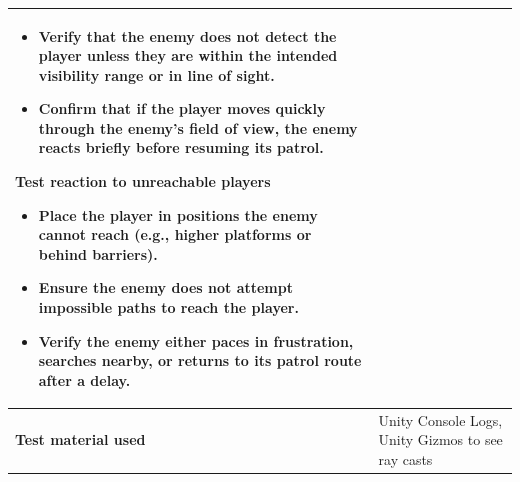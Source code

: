 \documentclass[11pt, a4paper]{article}
\begin{document}
\begin{center}
\begin{tabularx}{\linewidth}{|>{\raggedright\arraybackslash}m{4cm}|X|}
\begin{itemize}
        \item Verify that the enemy does not detect the player unless they are within the intended visibility range or in line of sight.
        \item Confirm that if the player moves quickly through the enemy’s field of view, the enemy reacts briefly before resuming its patrol.
    \end{itemize}
    \textbf{Test reaction to unreachable players}
    \begin{itemize}
        \item Place the player in positions the enemy cannot reach (e.g., higher platforms or behind barriers).
        \item Ensure the enemy does not attempt impossible paths to reach the player.
        \item Verify the enemy either paces in frustration, searches nearby, or returns to its patrol route after a delay.
    \end{itemize}
    \\
    \hline
    \textbf{Test material used} & Unity Console Logs, Unity Gizmos to see ray casts \\
    \hline
\end{tabularx}
\end{center}
\end{document}
